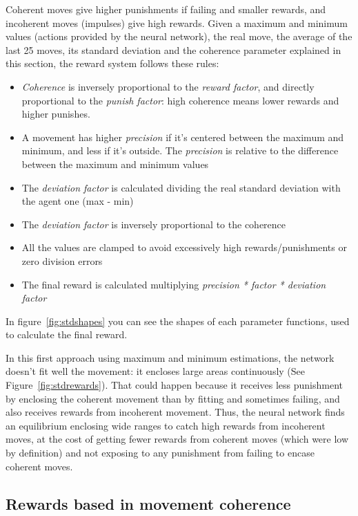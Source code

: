 Coherent moves give higher punishments if failing and smaller rewards, and incoherent moves (impulses) give high rewards. Given a maximum and minimum values (actions provided by the neural network), the real move, the average of the last 25 moves, its standard deviation and the coherence parameter explained in this section, the reward system follows these rules:

\begin{itemize}
 \item \emph{Coherence} is inversely proportional to the \emph{reward factor}, and directly proportional to the \emph{punish factor}: high coherence means lower rewards and higher punishes.
 \item A movement has higher \emph{precision} if it's centered between the maximum and minimum, and less if it's outside. The \emph{precision} is relative to the difference between the maximum and minimum values
 \item The \emph{deviation factor} is calculated dividing the real standard deviation with the agent one (max - min)
 \item The \emph{deviation factor} is inversely proportional to the coherence
 \item All the values are clamped to avoid excessively high rewards/punishments or zero division errors
 \item The final reward is calculated multiplying \emph{precision * factor * deviation factor}
\end{itemize}

In figure~\ref{fig:stdshapes} you can see the shapes of each parameter functions, used to calculate the final reward.


In this first approach using maximum and minimum estimations, the network doesn't fit well the movement: it encloses large areas continuously (See Figure~\ref{fig:stdrewards}). That could happen because it receives less punishment by enclosing the coherent movement than by fitting and sometimes failing, and also receives rewards from incoherent movement. Thus, the neural network finds an equilibrium enclosing wide ranges to catch high rewards from incoherent moves, at the cost of getting fewer rewards from coherent moves (which were low by definition) and not exposing to any punishment from failing to encase coherent moves.

\subsection{Rewards based in movement coherence}
\label{sec:cohrew}

